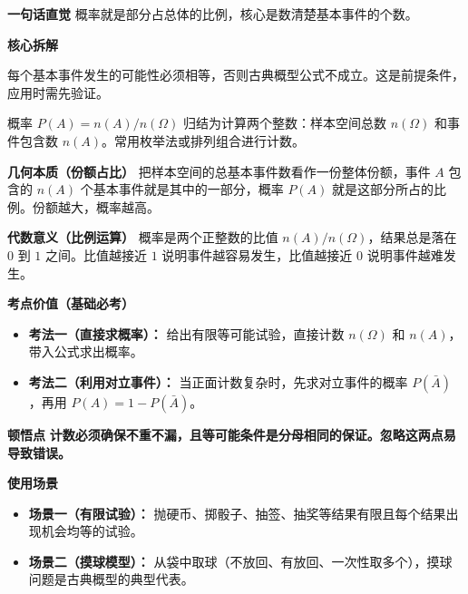 \begin{explanationbox}
	\textbf{\textcolor{CExplanation}{一句话直觉}}
	概率就是部分占总体的比例，核心是数清楚基本事件的个数。

	\medskip
	\textbf{\textcolor{CExplanation}{核心拆解}}
	\begin{description}[style=nextline, leftmargin=2.8em, labelsep=0.5em, itemsep=0.45em]
		\item[\textbf{要点一（等可能前提）：}]
			每个基本事件发生的可能性必须相等，否则古典概型公式不成立。这是前提条件，应用时需先验证。
		\item[\textbf{要点二（计数核心）：}]
			概率 $P(A)=n(A)/n(\Omega)$ 归结为计算两个整数：样本空间总数 $n(\Omega)$ 和事件包含数 $n(A)$。常用枚举法或排列组合进行计数。
	\end{description}

	\medskip
	\textbf{\textcolor{CExplanation}{几何本质（份额占比）}}
	把样本空间的总基本事件数看作一份整体份额，事件 $A$ 包含的 $n(A)$ 个基本事件就是其中的一部分，概率 $P(A)$ 就是这部分所占的比例。份额越大，概率越高。

	\medskip
	\textbf{\textcolor{CExplanation}{代数意义（比例运算）}}
	概率是两个正整数的比值 $n(A)/n(\Omega)$，结果总是落在 $0$ 到 $1$ 之间。比值越接近 $1$ 说明事件越容易发生，比值越接近 $0$ 说明事件越难发生。

	\medskip
	\textbf{\textcolor{CExplanation}{考点价值（基础必考）}}
	\begin{itemize}[leftmargin=*, itemsep=0.5em, topsep=0.4em]
		\item \textbf{考法一（直接求概率）：} 给出有限等可能试验，直接计数 $n(\Omega)$ 和 $n(A)$，带入公式求出概率。
		\item \textbf{考法二（利用对立事件）：} 当正面计数复杂时，先求对立事件的概率 $P(\bar{A})$，再用 $P(A)=1-P(\bar{A})$。
	\end{itemize}

	\medskip
	\textbf{\textcolor{CExplanation}{顿悟点}}
	\textbf{计数必须确保不重不漏，且等可能条件是分母相同的保证。忽略这两点易导致错误。}

	\medskip
	\textbf{\textcolor{CExplanation}{使用场景}}
	\begin{itemize}[leftmargin=*, itemsep=0.5em, topsep=0.4em]
		\item \textbf{场景一（有限试验）：} 抛硬币、掷骰子、抽签、抽奖等结果有限且每个结果出现机会均等的试验。
		\item \textbf{场景二（摸球模型）：} 从袋中取球（不放回、有放回、一次性取多个），摸球问题是古典概型的典型代表。
	\end{itemize}

\end{explanationbox}
